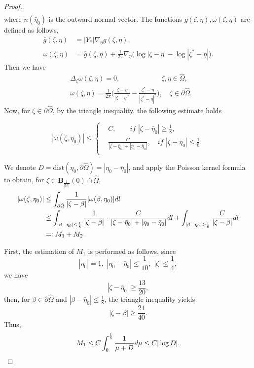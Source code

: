 \documentclass[10pt,a4paper]{amsart}
\begin{document}
\begin{proof}
\begin{align}
\end{align}
where $n(\bar{\eta}_{0})$ is the outward normal vector. The functions $\bar{g}(\zeta,\eta),\omega(\zeta,\eta)$ are defined as follows,
\begin{align}
\bar{g}(\zeta,\eta)&=|Y_{*}|\nabla_{\eta}g(\zeta,\eta),\nonumber\\
\omega(\zeta,\eta)&=\bar{g}(\zeta,\eta)+\frac{1}{2\pi}\nabla_{\eta}\big(\log|\zeta-\eta|-\log|\zeta^{*}-\eta|\big).\nonumber
\end{align}
Then we have
\begin{align}
&\Delta_{\zeta}\omega(\zeta,\eta)=0, \qquad \qquad\qquad \zeta,\eta\in\hat{\Omega},\nonumber\\
&\omega(\zeta,\eta)=\frac{1}{2\pi}\big(\frac{\zeta-\eta}{|\zeta-\eta|^{2}}-\frac{\zeta^{*}-\eta}{|\zeta^{*}-\eta|^{2}}\big),\quad \zeta\in\partial\hat{\Omega}.\nonumber
\end{align}
Now, for $\zeta\in\partial\hat{\Omega}$, by the triangle inequality, the following estimate holds

\begin{equation}\nonumber
|\omega(\zeta,\eta_{0})|\leq\left\{\begin{aligned}
 &C, \qquad  if\,\, |\zeta-\bar{\eta}_{0}|\geq \frac{1}{8}, \\
&\frac{C}{|\zeta-\bar{\eta}_{0}|+|\eta_{0}-\bar{\eta}_{0}|}, \quad  if\,\, |\zeta-\bar{\eta}_{0}|\leq \frac{1}{8}.\\
\end{aligned}  \right.
\end{equation}

We denote $D=\text{dist}(\eta_{0},\partial\hat{\Omega})=|\eta_{0}-\bar{\eta}_{0}|$, and apply the Poisson kernel formula to obtain, for $\zeta\in \mathbf{B}_{\frac{1}{|Y_{*}|}}(0)\cap\hat{\Omega}$,
\begin{align}
|\omega(\zeta,\eta_{0})|&\leq\int_{\partial\hat{\Omega}}\frac{1}{|\zeta-\beta|}|\omega(\beta,\eta_{0})|{\rm d}l\nonumber\\
&\leq\int_{|\beta-\bar{\eta}_{0}|\leq\frac{1}{8}}\frac{1}{|\zeta-\beta|}\cdot\frac{C}{|\zeta-\bar{\eta}_{0}|+|\eta_{0}-\bar{\eta}_{0}|}{\rm d}l+
\int_{|\beta-\bar{\eta}_{0}|\geq\frac{1}{8}}\frac{C}{|\zeta-\beta|}{\rm d}l\nonumber\\
&=:M_{1}+M_{2}\nonumber.
\end{align}

First, the estimation of $M_{1}$ is performed  as follows, since
$$|\eta_{0}|=1,\,\, |\eta_{0}-\bar{\eta}_{0}|\leq\frac{1}{10},\,\, |\zeta|\leq \frac{1}{4},$$
we have
$$|\zeta-\bar{\eta}_{0}|\geq\frac{13}{20},$$
then, for $\beta\in \partial\hat{\Omega}$ and $|\beta-\bar{\eta}_{0}|\leq\frac{1}{8}$, the triangle inequality yields
$$|\zeta-\beta|\geq\frac{21}{40}.$$
Thus,
\begin{align}
M_{1}\leq C\int_{0}^{\frac{1}{8}}\frac{1}{\mu+D}{\rm d}\mu\leq C|\log D|.\nonumber
\end{align}


\end{proof}
\end{document}
